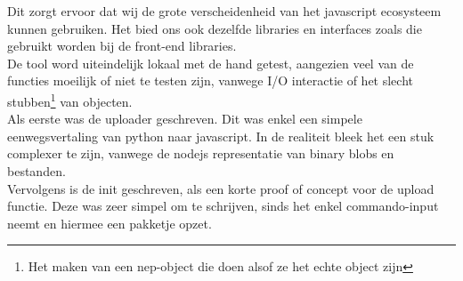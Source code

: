 Dit zorgt ervoor dat wij de grote verscheidenheid van het javascript ecosysteem kunnen gebruiken. Het bied ons ook dezelfde libraries en interfaces zoals die gebruikt worden bij de front-end libraries. \\ 

De tool word uiteindelijk lokaal met de hand getest, aangezien veel van de functies moeilijk of niet te testen zijn, vanwege I/O interactie of het slecht stubben\footnote{Het maken van een nep-object die doen alsof ze het echte object zijn} van objecten. \\

Als eerste was de uploader geschreven. Dit was enkel een simpele eenwegsvertaling van python naar javascript. In de realiteit bleek het een stuk complexer te zijn, vanwege de nodejs representatie van binary blobs en bestanden. \\ 

Vervolgens is de init geschreven, als een korte proof of concept voor de upload functie. Deze was zeer simpel om te schrijven, sinds het enkel commando-input neemt en hiermee een pakketje opzet. \\

